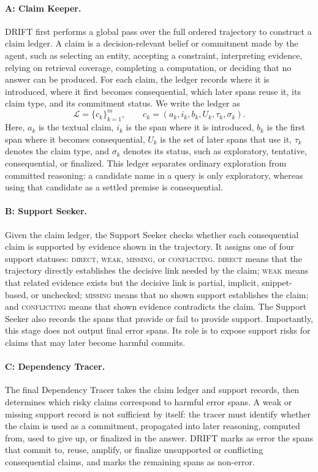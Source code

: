 \paragraph{A: Claim Keeper.}
\textsc{DRIFT} first performs a global pass over the full ordered trajectory to construct a claim ledger. A claim is a decision-relevant belief or commitment made by the agent, such as selecting an entity, accepting a constraint, interpreting evidence, relying on retrieval coverage, completing a computation, or deciding that no answer can be produced. For each claim, the ledger records where it is introduced, where it first becomes consequential, which later spans reuse it, its claim type, and its commitment status. We write the ledger as
\begin{equation}
    \mathcal{L}=\{c_k\}_{k=1}^{m},
    \qquad
    c_k=(a_k,i_k,b_k,U_k,\tau_k,\sigma_k).
    \label{eq:claim-ledger}
\end{equation}
Here, $a_k$ is the textual claim, $i_k$ is the span where it is introduced, $b_k$ is the first span where it becomes consequential, $U_k$ is the set of later spans that use it, $\tau_k$ denotes the claim type, and $\sigma_k$ denotes its status, such as exploratory, tentative, consequential, or finalized. This ledger separates ordinary exploration from committed reasoning: a candidate name in a query is only exploratory, whereas using that candidate as a settled premise is consequential.


\paragraph{B: Support Seeker.}
Given the claim ledger, the Support Seeker checks whether each consequential claim is supported by evidence shown in the trajectory. It assigns one of four support statuses: \textsc{direct}, \textsc{weak}, \textsc{missing}, or \textsc{conflicting}. \textsc{direct} means that the trajectory directly establishes the decisive link needed by the claim; \textsc{weak} means that related evidence exists but the decisive link is partial, implicit, snippet-based, or unchecked; \textsc{missing} means that no shown support establishes the claim; and \textsc{conflicting} means that shown evidence contradicts the claim. The Support Seeker also records the spans that provide or fail to provide support. Importantly, this stage does not output final error spans. Its role is to expose support risks for claims that may later become harmful commits.

\paragraph{C: Dependency Tracer.}
The final Dependency Tracer takes the claim ledger and support records, then determines which risky claims correspond to harmful error spans. A weak or missing support record is not sufficient by itself: the tracer must identify whether the claim is used as a commitment, propagated into later reasoning, computed from, used to give up, or finalized in the answer. \textsc{DRIFT} marks as error the spans that commit to, reuse, amplify, or finalize unsupported or conflicting consequential claims, and marks the remaining spans as non-error.

